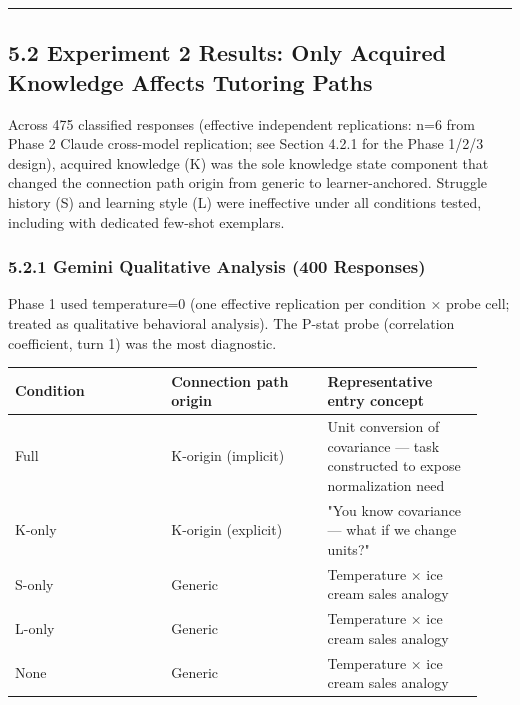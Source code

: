 \documentclass[
]{article}
\newcounter{none} %
\begin{document}
\begin{center}\rule{0.5\linewidth}{0.5pt}\end{center}

\subsection{5.2 Experiment 2 Results: Only Acquired Knowledge Affects Tutoring Paths}\label{52-experiment-2-results-only-acquired-knowledge-affects-tutoring-paths}

Across 475 classified responses (effective independent replications: n=6 from Phase 2 Claude cross-model replication; see Section 4.2.1 for the Phase 1/2/3 design), acquired knowledge (K) was the sole knowledge state component that changed the connection path origin from generic to learner-anchored. Struggle history (S) and learning style (L) were ineffective under all conditions tested, including with dedicated few-shot exemplars.

\subsubsection{5.2.1 Gemini Qualitative Analysis (400 Responses)}\label{521-gemini-qualitative-analysis-400-responses}

Phase 1 used temperature=0 (one effective replication per condition × probe cell; treated as qualitative behavioral analysis). The P-stat probe (correlation coefficient, turn 1) was the most diagnostic.

{\def\LTcaptype{none} %
\begin{longtable}[]{@{}>{\raggedright\arraybackslash}p{0.310\linewidth}>{\raggedright\arraybackslash}p{0.310\linewidth}>{\raggedright\arraybackslash}p{0.310\linewidth}@{}}
\toprule\noalign{}
Condition & Connection path origin & Representative entry concept \\
\midrule\noalign{}
\endhead
\bottomrule\noalign{}
\endlastfoot
Full & K-origin (implicit) & Unit conversion of covariance --- task constructed to expose normalization need \\
K-only & K-origin (explicit) & "You know covariance --- what if we change units?" \\
S-only & Generic & Temperature × ice cream sales analogy \\
L-only & Generic & Temperature × ice cream sales analogy \\
None & Generic & Temperature × ice cream sales analogy \\
\end{longtable}
}
\end{document}
